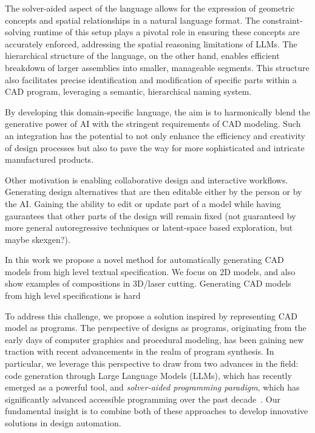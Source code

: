 The solver-aided aspect of the language allows for the expression of geometric concepts and spatial relationships in a natural language format. The constraint-solving runtime of this setup plays a pivotal role in ensuring these concepts are accurately enforced, addressing the spatial reasoning limitations of LLMs. The hierarchical structure of the language, on the other hand, enables efficient breakdown of larger assemblies into smaller, manageable segments. This structure also facilitates precise identification and modification of specific parts within a CAD program, leveraging a semantic, hierarchical naming system.

By developing this domain-specific language, the aim is to harmonically blend the generative power of AI with the stringent requirements of CAD modeling. Such an integration has the potential to not only enhance the efficiency and creativity of design processes but also to pave the way for more sophisticated and intricate manufactured products.


Other motivation is enabling collaborative design and interactive workflows. Generating design alternatives that are then editable either by the person or by the AI. Gaining the ability to edit or update part of a model while having gaurantees that other parts of the design will remain fixed (not guaranteed by more general autoregressive techniques or latent-space based exploration, but maybe skexgen?).


In this work we propose a novel method for automatically generating CAD models from high level textual specification. We focus on 2D models, and also show examples of compositions in 3D/laser cutting. Generating CAD models from high level specifications is hard


To address this challenge, we propose a solution inspired by representing CAD model as programs. The perspective of designs as programs, originating from the early days of computer graphics and procedural modeling, has been gaining new traction with recent advancements in the realm of program synthesis. In particular, we leverage this perspective to draw from two advances in the field: code generation through Large Language Models (LLMs), which has recently emerged as a powerful tool, and  \emph{solver-aided programming paradigm}, which has significantly advanced accessible programming over the past decade~\cite{torlak2013growing}. Our fundamental insight is to combine both of these approaches to develop innovative solutions in design automation. 

